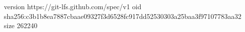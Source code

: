 version https://git-lfs.github.com/spec/v1
oid sha256:c3b1b8ea7887cbaae09327f3d6528fc917dd52530303a25baa3f97107783aa32
size 262240
